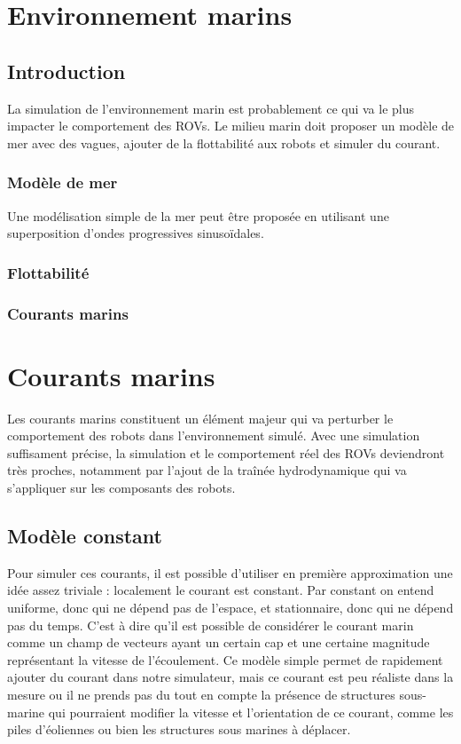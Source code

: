 	\section{Environnement marins}

		\subsection{Introduction}
			
			La simulation de l'environnement marin est probablement ce qui va le plus impacter le comportement des \gls{ROV}s. Le milieu marin doit proposer un modèle de mer avec des vagues, ajouter de la flottabilité aux robots et simuler du courant.

			\subsubsection{Modèle de mer}

				Une modélisation simple de la mer peut être proposée en utilisant une superposition d'ondes progressives sinusoïdales. 

			\subsubsection{Flottabilité}

			\subsubsection{Courants marins}

	\section{Courants marins}

		Les courants marins constituent un élément majeur qui va perturber le comportement des robots dans l'environnement simulé. Avec une simulation suffisament précise, la simulation et le comportement réel des \gls{ROV}s deviendront très proches, notamment par l'ajout de la traînée hydrodynamique qui va s'appliquer sur les composants des robots.

		\subsection{Modèle constant}

			Pour simuler ces courants, il est possible d'utiliser en première approximation une idée assez triviale : localement le courant est constant. Par constant on entend uniforme, donc qui ne dépend pas de l'espace, et stationnaire, donc qui ne dépend pas du temps. C'est à dire qu'il est possible de considérer le courant marin  comme un champ de vecteurs ayant un certain cap et une certaine magnitude représentant la vitesse de l'écoulement. Ce modèle simple permet de rapidement ajouter du courant dans notre simulateur, mais ce courant est peu réaliste dans la mesure ou il ne prends pas du tout en compte la présence de structures sous-marine qui pourraient modifier la vitesse et l'orientation de ce courant, comme les piles d'éoliennes ou bien les structures sous marines à déplacer.

